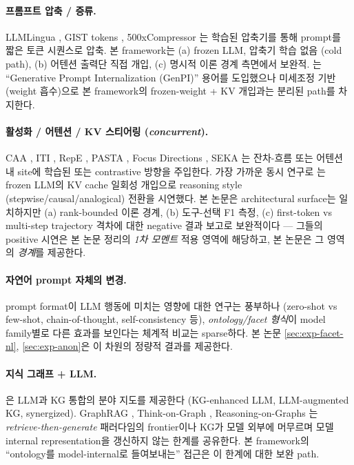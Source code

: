 \documentclass[11pt]{article}
\theoremstyle{definition}
\begin{document}
\paragraph{프롬프트 압축 / 증류.}
LLMLingua \citep{jiang2023llmlingua}, GIST tokens \citep{mu2023gist}, 500xCompressor \citep{li2024compressor}는 학습된 압축기를 통해 prompt를 짧은 토큰 시퀀스로 압축. 본 framework는 (a) frozen LLM, 압축기 학습 없음 (cold path), (b) 어텐션 출력단 직접 개입, (c) 명시적 이론 경계 측면에서 보완적. \citet{shin2025genpi}는 ``Generative Prompt Internalization (GenPI)'' 용어를 도입했으나 미세조정 기반 (weight 흡수)으로 본 framework의 frozen-weight + KV 개입과는 분리된 path를 차지한다.

\paragraph{활성화 / 어텐션 / KV 스티어링 (\emph{concurrent}).}
CAA \citep{rimsky2024caa}, ITI \citep{li2023iti}, RepE \citep{zou2023repe}, PASTA \citep{zhang2023pasta}, Focus Directions \citep{zhu2025focus}, SEKA \citep{lee2025seka}는 잔차-흐름 또는 어텐션 내 site에 학습된 또는 contrastive 방향을 주입한다. 가장 가까운 동시 연구로 \citet{belitsky2025kvsteer}는 frozen LLM의 KV cache 일회성 개입으로 reasoning style (stepwise/causal/analogical) 전환을 시연했다. 본 논문은 architectural surface는 일치하지만 (a) rank-bounded 이론 경계, (b) 도구-선택 F1 측정, (c) first-token vs multi-step trajectory 격차에 대한 negative 결과 보고로 보완적이다 --- 그들의 positive 시연은 본 논문 정리의 \emph{1차 모멘트} 적용 영역에 해당하고, 본 논문은 그 영역의 \emph{경계}를 제공한다.

\paragraph{자연어 prompt 자체의 변경.}
prompt format이 LLM 행동에 미치는 영향에 대한 연구는 풍부하나 (zero-shot vs few-shot, chain-of-thought, self-consistency 등), \emph{ontology/facet 형식}이 model family별로 다른 효과를 보인다는 체계적 비교는 sparse하다. 본 논문 \cref{sec:exp-facet-nl}, \cref{sec:exp-anon}은 이 차원의 정량적 결과를 제공한다.

\paragraph{지식 그래프 + LLM.}
\citet{pan2024kgllm}은 LLM과 KG 통합의 분야 지도를 제공한다 (KG-enhanced LLM, LLM-augmented KG, synergized). GraphRAG \citep{edge2024graphrag}, Think-on-Graph \citep{sun2024tog}, Reasoning-on-Graphs \citep{luo2024rog}는 \emph{retrieve-then-generate} 패러다임의 frontier이나 KG가 모델 외부에 머무르며 모델 internal representation을 갱신하지 않는 한계를 공유한다. 본 framework의 ``ontology를 model-internal로 들여보내는'' 접근은 이 한계에 대한 보완 path.
\end{document}
